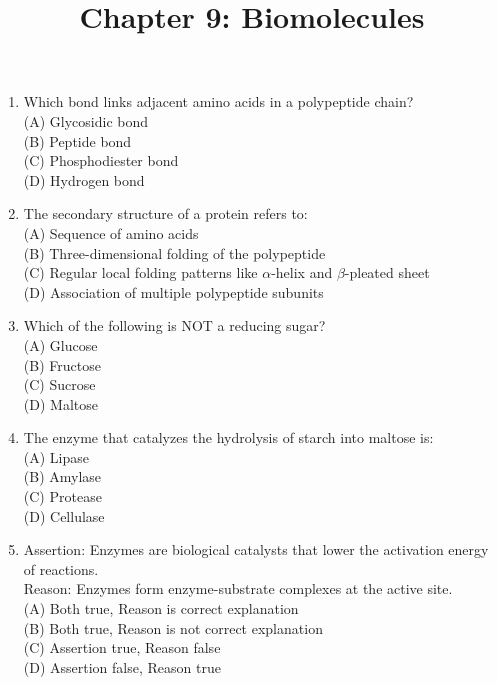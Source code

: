 \documentclass{article}
\begin{document}
\title{Chapter 9: Biomolecules}
\date{}
\maketitle

\begin{enumerate}[label=Q\arabic*.]

\item Which bond links adjacent amino acids in a polypeptide chain?
\\(A) Glycosidic bond
\\(B) Peptide bond
\\(C) Phosphodiester bond
\\(D) Hydrogen bond

\item The secondary structure of a protein refers to:
\\(A) Sequence of amino acids
\\(B) Three-dimensional folding of the polypeptide
\\(C) Regular local folding patterns like $\alpha$-helix and $\beta$-pleated sheet
\\(D) Association of multiple polypeptide subunits

\item Which of the following is NOT a reducing sugar?
\\(A) Glucose
\\(B) Fructose
\\(C) Sucrose
\\(D) Maltose

\item The enzyme that catalyzes the hydrolysis of starch into maltose is:
\\(A) Lipase
\\(B) Amylase
\\(C) Protease
\\(D) Cellulase

\item Assertion: Enzymes are biological catalysts that lower the activation energy of reactions.\\
Reason: Enzymes form enzyme-substrate complexes at the active site.
\\(A) Both true, Reason is correct explanation
\\(B) Both true, Reason is not correct explanation
\\(C) Assertion true, Reason false
\\(D) Assertion false, Reason true


\end{enumerate}
\end{document}
